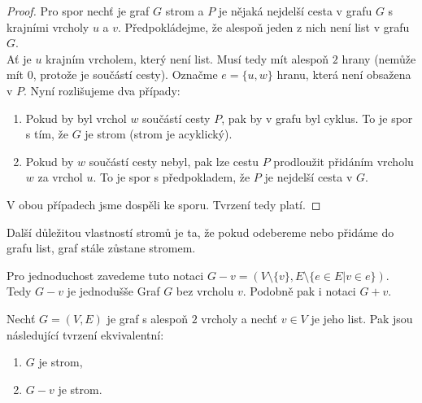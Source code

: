 \begin{proof}
Pro spor nechť je graf $G$ strom a $P$ je nějaká nejdelší cesta v grafu $G$ s krajními vrcholy $u$ a $v$. Předpokládejme, že alespoň jeden z nich není list v grafu $G$. \\

\noindent Ať je $u$ krajním vrcholem, který není list. Musí tedy mít alespoň $2$ hrany (nemůže mít $0$, protože je součástí cesty). Označme $e = \{u,w\}$ hranu, která není obsažena v $P$. Nyní rozlišujeme dva případy:

\begin{enumerate}
    \item Pokud by byl vrchol $w$ součástí cesty $P$, pak by v grafu byl cyklus. To je spor s tím, že $G$ je strom (strom je acyklický).
    \item Pokud by $w$ součástí cesty nebyl, pak lze cestu $P$ prodloužit přidáním vrcholu $w$ za vrchol $u$. To je spor s předpokladem, že $P$ je nejdelší cesta v $G$.
\end{enumerate}

\noindent V obou případech jsme dospěli ke sporu. Tvrzení tedy platí.
\end{proof} \bigskip

\noindent Další důležitou vlastností stromů je ta, že pokud odebereme nebo přidáme do grafu list, graf stále zůstane stromem.

\medskip

\noindent Pro jednoduchost zavedeme tuto notaci $G - v = (V \setminus \{v\}, E \setminus \{e \in E | v \in e\})$. Tedy $G-v$ je jednodušše Graf $G$ bez vrcholu $v$. Podobně pak i notaci $G + v$.

\medskip

\begin{theorem}
Nechť $G = (V, E)$ je graf s alespoň $2$ vrcholy a nechť $v \in V$ je jeho list. Pak jsou následující tvrzení ekvivalentní:                \begin{enumerate} 
        \item $G$ je strom, \item $G - v$ je strom. 
    \end{enumerate} 
\end{theorem}

\medskip

